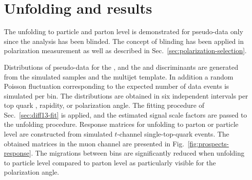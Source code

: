 
\section{Unfolding and results}

The unfolding to particle and parton level is demonstrated for pseudo-data only since the analysis has been blinded. The concept of blinding has been applied in polarization measurement as well as described in Sec.~\ref{sec:polarization-selection}.

Distributions of pseudo-data for the \mtw, and the \bdttt and \bdttch discriminants are generated from the simulated samples and the multijet template. In addition a random Poisson fluctuation corresponding to the expected number of data events is simulated per bin. The distributions are obtained in six independent intervals per top quark \pt, rapidity, or polarization angle. The fitting procedure of Sec.~\ref{sec:diff13-fit} is applied, and the estimated signal scale factors are passed to the unfolding procedure. Response matrices for unfolding to parton or particle level are constructed from simulated $t$-channel single-top-quark events. The obtained matrices in the muon channel are presented in Fig.~\ref{fig:prospects-response}. The migrations between bins are significantly reduced when unfolding to particle level compared to parton level as particularly visible for the polarization angle.

